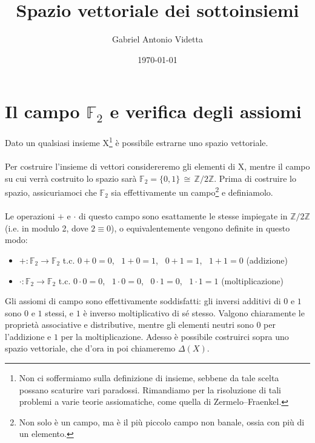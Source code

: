 \documentclass[a4paper]{article}
\title{Spazio vettoriale dei sottoinsiemi}
\author{Gabriel Antonio Videtta}
\date{\today}
\begin{document}
\maketitle

\newcommand{\FF}{\mathbb{F}_2}
\newcommand{\ZZ}{\mathbb{Z}}

\newtheorem{example}{Esempio}[section]
\newtheorem{exercise}{Esercizio}[section]
\newtheorem{theorem}{Teorema}[section]

\setlength\parindent{0pt}

\tableofcontents

\section{Il campo $\FF$ e verifica degli assiomi}

Dato un qualsiasi insieme X\footnote{Non ci soffermiamo sulla definizione di insieme,
sebbene da tale scelta possano scaturire vari paradossi. Rimandiamo per la risoluzione
di tali problemi a varie teorie assiomatiche, come quella di Zermelo–Fraenkel.} è possibile
estrarne uno spazio vettoriale. \\ \\
Per costruire l'insieme di vettori considereremo gli elementi di X, mentre il campo su cui verrà
costruito lo spazio sarà $\FF = \{0,1\} \, \cong \, \ZZ/2\ZZ$. Prima di costruire lo spazio,
assicuriamoci che $\FF$ sia effettivamente un campo\footnote{Non solo è un campo, ma è il più
piccolo campo non banale, ossia con più di un elemento.} e definiamolo. \\ \\
Le operazioni $+$ e $\cdot$ di questo campo sono esattamente le stesse impiegate in
$\ZZ/2\ZZ$ (i.e. in modulo 2, dove $2 \equiv 0$), o equivalentemente vengono definite in questo modo:
\begin{itemize}
    \item $+ : \FF \to \FF$ t.c. $0+0=0$, \, $1+0=1$, \, $0+1=1$, \, $1+1=0$ (addizione)
    \item $\cdot : \FF \to \FF$ t.c. $0\cdot0=0$, \, $1\cdot0=0$, \, $0\cdot1=0$, \, $1\cdot1=1$ (moltiplicazione)
\end{itemize}
Gli assiomi di campo sono effettivamente soddisfatti: gli inversi additivi di $0$ e $1$ sono $0$ e $1$ stessi, e $1$ è inverso moltiplicativo di sé stesso. Valgono chiaramente le
proprietà associative e distributive, mentre gli elementi neutri sono $0$ per l'addizione e
$1$ per la moltiplicazione.
Adesso è possibile costruirci sopra uno spazio vettoriale, che d'ora in poi chiameremo
$\Delta (X)$.
\end{document}
